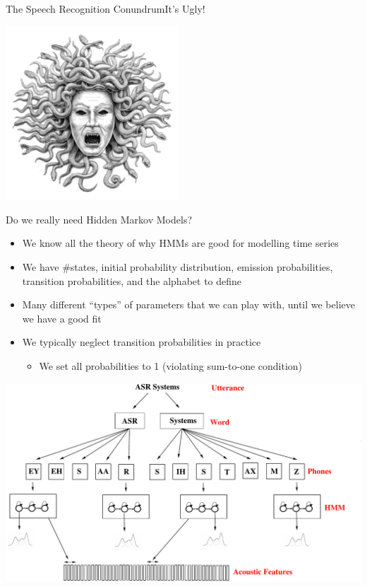 \begin{frame}{The Speech Recognition Conundrum}{It's Ugly!}
  \begin{center}
    \includegraphics[height=65mm]{figures/medusa}
  \end{center}
\end{frame}

\begin{frame}{Do we really need Hidden Markov Models?}
  \begin{itemize}
  \item We know all the theory of why HMMs are good for modelling time series
  \item We have \#states, initial probability distribution, emission probabilities,
    transition probabilities, and the alphabet to define
  \item Many different ``types'' of parameters that we can play with, until we believe we have a good fit
  \item We typically neglect transition probabilities in practice
    \begin{itemize}
    \item We set all probabilities to 1 (violating sum-to-one condition)
    \end{itemize}
  \end{itemize}
  \begin{center}
    \includegraphics[clip=true,trim=8cm 5.65cm 17.5cm 9.5cm]{figures/am-gmm.pdf}
  \end{center}
\end{frame}


